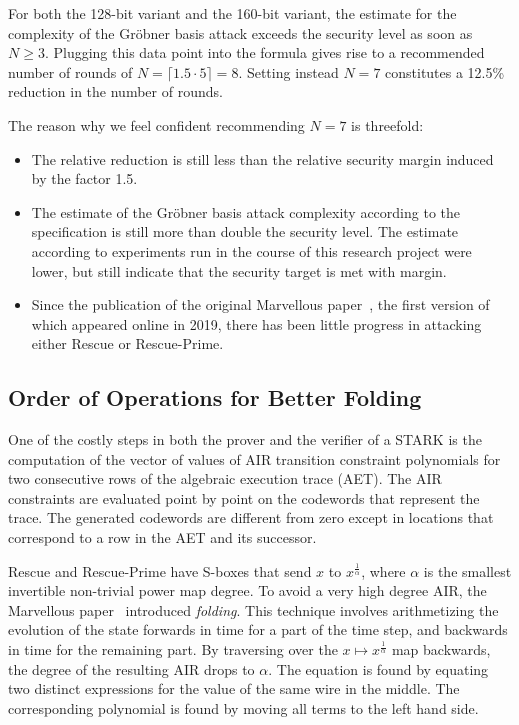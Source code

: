\documentclass[a4paper]{article}
\begin{document}
For both the 128-bit variant and the 160-bit variant, the estimate for the complexity of the Gröbner basis attack exceeds the security level as soon as $N \geq 3$. Plugging this data point into the formula gives rise to a recommended number of rounds of $N = \lceil 1.5 \cdot 5 \rceil = 8$. Setting instead $N=7$ constitutes a 12.5\% reduction in the number of rounds.

The reason why we feel confident recommending $N=7$ is threefold:
\begin{itemize}
 \item The relative reduction is still less than the relative security margin induced by the factor 1.5.
 \item The estimate of the Gröbner basis attack complexity according to the specification is still more than double the security level. The estimate according to experiments run in the course of this research project were lower, but still indicate that the security target is met with margin.
 \item Since the publication of the original Marvellous paper~\cite{cryptoeprint:2019/426}, the first version of which appeared online in 2019, there has been little progress in attacking either Rescue or Rescue-Prime.
\end{itemize}
 
\subsection{Order of Operations for Better Folding}

One of the costly steps in both the prover and the verifier of a STARK is the computation of the vector of values of AIR transition constraint polynomials for two consecutive rows of the algebraic execution trace (AET). The AIR constraints are evaluated point by point on the codewords that represent the trace. The generated codewords are different from zero except in locations that correspond to a row in the AET and its successor.

Rescue and Rescue-Prime have S-boxes that send $x$ to $x^{\frac{1}{\alpha}}$, where $\alpha$ is the smallest invertible non-trivial power map degree. To avoid a very high degree AIR, the Marvellous paper~\cite{cryptoeprint:2019/426} introduced \emph{folding}. This technique involves arithmetizing the evolution of the state forwards in time for a part of the time step, and backwards in time for the remaining part. By traversing over the $x \mapsto x^{\frac{1}{\alpha}}$ map backwards, the degree of the resulting AIR drops to $\alpha$. The equation is found by equating two distinct expressions for the value of the same wire in the middle. The corresponding polynomial is found by moving all terms to the left hand side.
\end{document}
